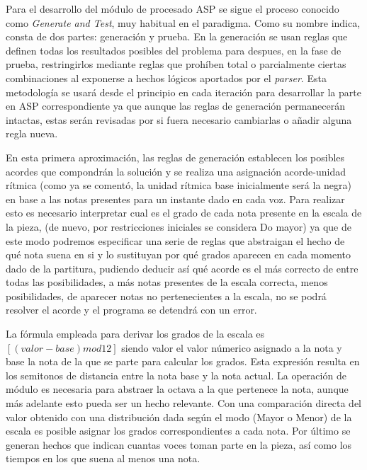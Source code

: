 Para el desarrollo del módulo de procesado ASP se sigue el proceso conocido como \textit{Generate and Test}, muy habitual en el paradigma. Como su nombre indica, consta de dos partes: generación y prueba. En la generación se usan reglas que definen todas los resultados posibles del problema para despues, en la fase de prueba, restringirlos mediante reglas que prohíben total o parcialmente ciertas combinaciones al exponerse a hechos lógicos aportados por el \textit{parser}. Esta metodología se usará desde el principio en cada iteración para desarrollar la parte en ASP correspondiente ya que aunque las reglas de generación permanecerán intactas, estas serán revisadas por si fuera necesario cambiarlas o añadir alguna regla nueva.

En esta primera aproximación, las reglas de generación establecen los posibles acordes que compondrán la solución y se realiza una asignación acorde-unidad rítmica (como ya se comentó, la unidad rítmica base inicialmente será la negra) en base a las notas presentes para un instante dado en cada voz. Para realizar esto es necesario interpretar cual es el grado de cada nota presente en la escala de la pieza, (de nuevo, por restricciones iniciales se considera Do mayor) ya que de este modo podremos especificar una serie de reglas que abstraigan el hecho de qué nota suena en si y lo sustituyan por qué grados aparecen en cada momento dado de la partitura, pudiendo deducir así qué acorde es el más correcto de entre todas las posibilidades, a más notas presentes de la escala correcta, menos posibilidades, de aparecer notas no pertenecientes a la escala, no se podrá resolver el acorde y el programa se detendrá con un error.

La fórmula empleada para derivar los grados de la escala es $[(valor-base) mod 12]$ siendo valor el valor númerico asignado a la nota y base la nota de la que se parte para calcular los grados. Esta expresión resulta en los semitonos de distancia entre la nota base y la nota actual. La operación de módulo es necesaria para abstraer la octava a la que pertenece la nota, aunque más adelante esto pueda ser un hecho relevante. Con una comparación directa del valor obtenido con una distribución dada según el modo (Mayor o Menor) de la escala es posible asignar los grados correspondientes a cada nota. Por último se generan hechos que indican cuantas voces toman parte en la pieza, así como los tiempos en los que suena al menos una nota.

